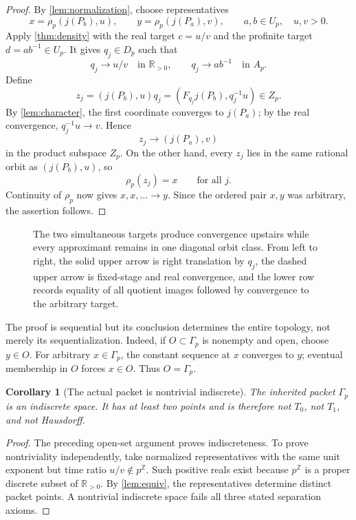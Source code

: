 \documentclass[11pt]{article}
\newtheorem{corollary}[theorem]{Corollary}
\theoremstyle{definition}
\newcommand{\R}{\mathbb{R}}
\newcommand{\Z}{\mathbb{Z}}
\begin{document}
\begin{proof}
By \cref{lem:normalization}, choose representatives
\[
 x=\rho_p(j(P_b),u),\qquad
 y=\rho_p(j(P_a),v),
 \qquad a,b\in U_p,\quad u,v>0.
\]
Apply \cref{thm:density} with the real target \(c=u/v\) and the profinite target \(d=ab^{-1}\in U_p\).  It gives \(q_j\in D_p\) such that
\[
 q_j\longrightarrow u/v\quad\text{in }\R_{>0},
 \qquad q_j\longrightarrow ab^{-1}\quad\text{in }A_p.
\]
Define
\[
 z_j=(j(P_b),u)q_j
     =(F_{q_j}j(P_b),q_j^{-1}u)\in Z_p.
\]
By \cref{lem:character}, the first coordinate converges to \(j(P_a)\); by the real convergence, \(q_j^{-1}u\to v\).  Hence
\[
 z_j\longrightarrow (j(P_a),v)
\]
in the product subspace \(Z_p\).  On the other hand, every \(z_j\) lies in the same rational orbit as \((j(P_b),u)\), so
\[
 \rho_p(z_j)=x\qquad\text{for all }j.
\]
Continuity of \(\rho_p\) now gives \(x,x,\ldots\to y\).  Since the ordered pair \(x,y\) was arbitrary, the assertion follows.
\end{proof}

\begin{figure}[htbp]
\centering
\resizebox{\textwidth}{!}{}
\caption{The two simultaneous targets produce convergence upstairs while every approximant remains in one diagonal orbit class.  From left to right, the solid upper arrow is right translation by \(q_j\), the dashed upper arrow is fixed-stage and real convergence, and the lower row records equality of all quotient images followed by convergence to the arbitrary target.}\label{fig:constant}
\end{figure}

The proof is sequential but its conclusion determines the entire topology, not merely its sequentialization.  Indeed, if \(O\subset\Gamma_p\) is nonempty and open, choose \(y\in O\).  For arbitrary \(x\in\Gamma_p\), the constant sequence at \(x\) converges to \(y\); eventual membership in \(O\) forces \(x\in O\).  Thus \(O=\Gamma_p\).

\begin{corollary}[The actual packet is nontrivial indiscrete]\label{cor:packet}
The inherited packet \(\Gamma_p\) is an indiscrete space.  It has at least two points and is therefore not \(T_0\), not \(T_1\), and not Hausdorff.
\end{corollary}

\begin{proof}
The preceding open-set argument proves indiscreteness.  To prove nontriviality independently, take normalized representatives with the same unit exponent but time ratio \(u/v\notin p^{\Z}\).  Such positive reals exist because \(p^{\Z}\) is a proper discrete subset of \(\R_{>0}\).  By \cref{lem:equiv}, the representatives determine distinct packet points.  A nontrivial indiscrete space fails all three stated separation axioms.
\end{proof}
\end{document}
